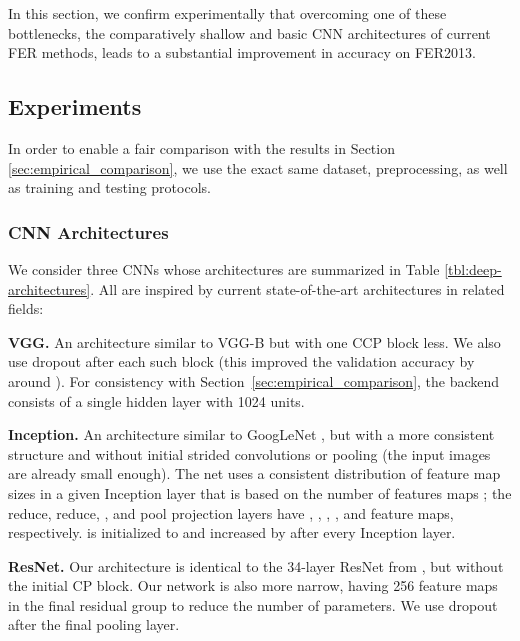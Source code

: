 \documentclass[conference,10pt,a4paper]{IEEEtran}
\begin{document}
In this section, we confirm experimentally that overcoming one of these bottlenecks, the comparatively shallow and basic CNN architectures of current FER methods, leads to a substantial improvement in accuracy on FER2013.

\subsection{Experiments} \label{sub:experiments}

In order to enable a fair comparison with the results in Section \ref{sec:empirical_comparison}, we use the exact same dataset, preprocessing, as well as training and testing protocols. 

\subsubsection{CNN Architectures} \label{ssub:cnn_architectures}



We consider three CNNs whose architectures are summarized in Table \ref{tbl:deep-architectures}. All are inspired by current state-of-the-art architectures in related fields:

\textbf{VGG.} An architecture similar to VGG-B \cite{simonyan14} but with one CCP block less. We also use dropout after each such block (this improved the validation accuracy by around ). For consistency with Section\ \ref{sec:empirical_comparison}, the backend consists of a single hidden layer with 1024 units.

\textbf{Inception.} An architecture similar to GoogLeNet \cite{szegedy15}, but with a more consistent structure and without initial strided convolutions or pooling (the input images are already small enough). The net uses a consistent distribution of feature map sizes in a given Inception layer that is based on the number of  features maps ; the  reduce,  reduce, , and pool projection layers have , , , , and  feature maps, respectively.  is initialized to  and increased by  after every Inception layer.

\textbf{ResNet.} Our architecture is identical to the 34-layer ResNet from \cite{he15}, but without the initial CP block. Our network is also more narrow, having 256 feature maps in the final residual group to reduce the number of parameters. We use dropout after the final pooling layer.
\end{document}
